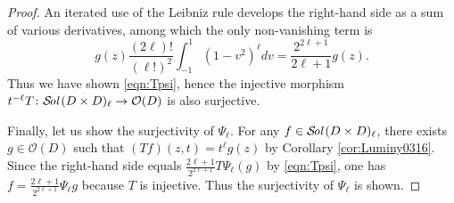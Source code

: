 \documentclass[10pt,a4paper]{amsart}
\newcommand\Sol{{\mathcal {S}}\!{\text{\it{ol}}}\,}
\begin{document}
\begin{proof}
An iterated use of the Leibniz rule develops the right-hand side
 as a sum of various derivatives, 
 among which the only non-vanishing term is 
\[ g(z)\frac{(2 \ell)!}{(\ell!)^2}
   \int_{-1}^1 (1-v^2)^{\ell} d v 
= \frac{2^{2\ell+1}}{2 \ell+1}g(z).  
\]
Thus we have shown \eqref{eqn:Tpsi}, 
 hence the injective morphism
 $t^{-\ell}T \colon \Sol(D \times D)_{\ell} \to {\mathcal{O}}(D)$
 is also surjective.  



Finally, 
 let us show the surjectivity of $\Psi_{\ell}$.  
For any $f \in \Sol(D \times D)_{\ell}$, 
 there exists $g \in {\mathcal{O}}(D)$
 such that
$(T f)(z,t)=t^{\ell}g (z)$
 by Corollary \ref{cor:Luminy0316}.  
Since the right-hand side equals 
 $\frac{2\ell+1}{2^{2\ell+1}} T \Psi_{\ell}(g)$
  by \eqref{eqn:Tpsi}, 
 one has 
 $f=\frac{2\ell+1}{2^{2\ell+1}} \Psi_{\ell}g$
 because $T$ is injective.  
Thus the surjectivity of $\Psi_{\ell}$ is shown.  
\end{proof}
\end{document}
